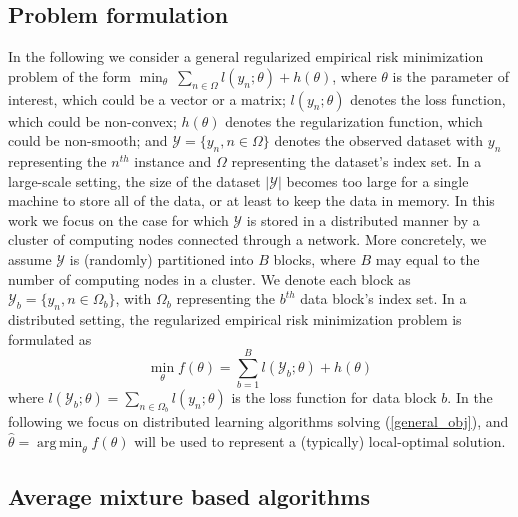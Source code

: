 \documentclass{article}
\DeclareMathOperator*{\argmin}{arg\,min}
\newcommand{\1}[0]{\ensuremath{\boldsymbol{1}}\xspace}
\begin{document}
\subsection{Problem formulation}\label{problem_formulation}
In the following we consider a general regularized empirical risk minimization problem of the form $\min_\theta ~ \sum_{n\in\Omega}l(y_n; \theta)+ h(\theta)$, where $\theta$ is the parameter of interest, which could be a vector or a matrix; $l(y_n; \theta)$ denotes the loss function, which could be non-convex; $h(\theta)$ denotes the regularization function, which could be non-smooth; and $\mathcal{Y} = \{y_n, n\in\Omega\}$ denotes the observed dataset with $y_n$ representing the $n^{th}$ instance and $\Omega$ representing the dataset's index set. In a large-scale setting, the size of the dataset $|\mathcal{Y}|$ becomes too large for a single machine to store all of the data, or at least to keep the data in memory. In this work we focus on the case for which $\mathcal{Y}$ is stored in a distributed manner by a cluster of computing nodes connected through a network. More concretely, we assume $\mathcal{Y}$ is (randomly) partitioned into $B$ blocks, where $B$ may equal to the number of computing nodes in a cluster. We denote each block as $\mathcal{Y}_b = \{y_n, n \in \Omega_b\}$, with $\Omega_b$ representing the $b^{th}$ data block's index set. In a distributed setting, the regularized empirical risk minimization problem is formulated as
\begin{equation}\label{general_obj}
\textstyle\min_{\theta} f(\theta) = \sum_{b=1}^Bl(\mathcal{Y}_b; \theta)+h(\theta)
\end{equation}
where $l(\mathcal{Y}_b; \theta) = \sum_{n\in\Omega_b}l(y_n; \theta)$ is the loss function for data block $b$. In the following we focus on distributed learning algorithms solving (\ref{general_obj}), and $\hat\theta = \argmin_\theta f(\theta)$ will be used to represent a (typically) local-optimal solution.

\subsection{Average mixture based algorithms}\label{avgm}
\end{document}
